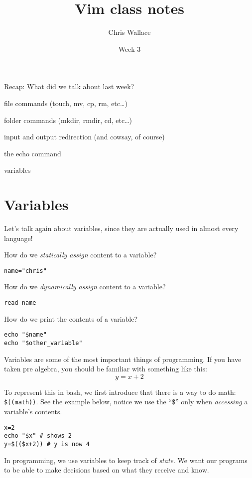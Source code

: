 \documentclass{article}
\title{Vim class notes}
\author{Chris Wallace}
\date{Week 3}
\begin{document}
\maketitle

\noindent Recap: What did we talk about last week?
\begin{compactitem}
    \item file commands (touch, mv, cp, rm, etc\dots)
    \item folder commands (mkdir, rmdir, cd, etc\dots)
    \item input and output redirection (and cowsay, of course)
    \item the echo command
    \item variables
\end{compactitem}

\section*{Variables}
Let's talk again about variables, since they are actually used in almost every
language!

How do we \textit{statically assign} content to a variable?
\begin{lstlisting}
name="chris"
\end{lstlisting}

How do we \textit{dynamically assign} content to a variable?
\begin{lstlisting}
read name
\end{lstlisting}

How do we print the contents of a variable?
\begin{lstlisting}
echo "$name"
echo "$other_variable"
\end{lstlisting}

Variables are some of the most important things of programming. If you have
taken pre algebra, you should be familiar with something like this:
\[
    y = x + 2
\]

To represent this in bash, we first introduce that there is a way to do math:
\lstinline|$((math))|. See the example below, notice we use the ``\$'' only
when \textit{accessing} a variable's contents.
\begin{lstlisting}
x=2
echo "$x" # shows 2
y=$(($x+2)) # y is now 4
\end{lstlisting}

In programming, we use variables to keep track of \textit{state}. We want our
programs to be able to make decisions based on what they receive and know.
\end{document}
